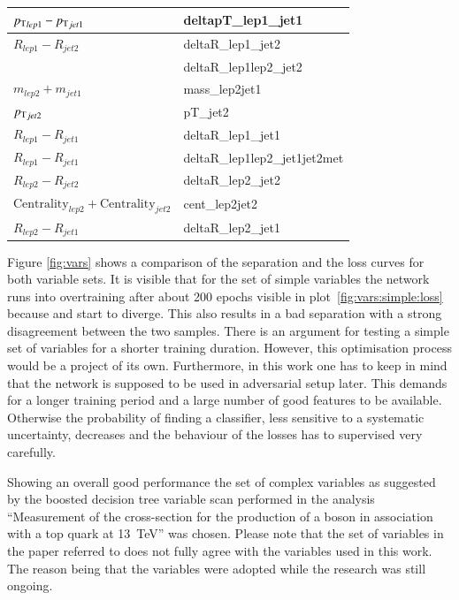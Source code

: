 \begin{table}[h]
\begin{minipage}{.5\linewidth}
\begin{tabular}{l|l}
		${p_{\text{T}}}_{lep1} - {p_{\text{T}}}_{jet1}$							& deltapT\_lep1\_jet1           \\ \hline
		${R}_{lep1} - {R}_{jet2}$								& deltaR\_lep1\_jet2            \\ \hline
		         & deltaR\_lep1lep2\_jet2        \\ \hline
		$m_{lep2} + m_{jet1}$									& mass\_lep2jet1                \\ \hline
		${p_{\text{T}}}_{jet2}$											& pT\_jet2                      \\ \hline
		${R}_{lep1} - {R}_{jet1}$								& deltaR\_lep1\_jet1            \\ \hline
		${R}_{lep1} - {R}_{jet1}$		& deltaR\_lep1lep2\_jet1jet2met \\ \hline
		${R}_{lep2} - {R}_{jet2}$								& deltaR\_lep2\_jet2            \\ \hline
		$\text{Centrality}_{lep2} + \text{Centrality}_{jet2}$	& cent\_lep2jet2                \\ \hline
		${R}_{lep2} - {R}_{jet1}$		& deltaR\_lep2\_jet1            \\ \hline
		\end{tabular}
    \end{minipage} 
\end{table}
%
Figure \ref{fig:vars} shows a comparison of the separation and the loss curves for both variable sets. It is visible that for the set of simple variables the network runs into overtraining after about \num{200} epochs visible in plot~\ref{fig:vars:simple:loss} because \losstrain and \losstest start to diverge. This also results in a bad separation with a strong disagreement between the two samples. There is an argument for testing a simple set of variables for a shorter training duration. However, this optimisation process would be a project of its own. Furthermore, in this work one has to keep in mind that the network is supposed to be used in adversarial setup later. This demands for a longer training period and a large number of good features to be available. Otherwise the probability of finding a classifier, less sensitive to a systematic uncertainty, decreases and the behaviour of the losses has to supervised very carefully.

Showing an overall good performance the set of complex variables as suggested by the boosted decision tree variable scan performed in the analysis \enquote{Measurement of the cross-section for the production of a \PW boson in association with a top quark at \SI{13}{\tera \electronvolt}} was chosen\cite{Finelli:2667560}. Please note that the set of variables in the paper referred to does not fully agree with the variables used in this work. The reason being that the variables were adopted while the research was still ongoing.

